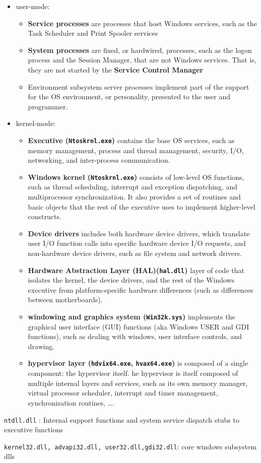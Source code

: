 \begin{itemize}
    \item user-mode:
        \begin{itemize}
            \item {\bf Service processes} are processes that host Windows services, such as the Task Scheduler and Print Spooler services
            \item {\bf System processes} are fixed, or hardwired, processes, such as the logon process and the Session Manager, that are not Windows services. That is, they are not started by the {\bf Service Control Manager}
            \item Environment subsystem server processes implement part of the support for the OS environment, or personality, presented to the user and programmer. 
        \end{itemize}
    \item kernel-mode:
        \begin{itemize}
            \item {\bf Executive (\verb+Ntoskrnl.exe+)} contains the base OS services, such as memory management, process and thread management, security, I/O, networking, and inter-process communication.
            \item {\bf Windows kernel (\verb+Ntoskrnl.exe+)} consists of low-level OS functions, such as thread scheduling, interrupt and exception dispatching, and multiprocessor synchronization. It also provides a set of routines and basic objects that the rest of the executive uses to implement higher-level constructs.
            \item {\bf Device drivers} includes both hardware device drivers, which translate user I/O function calls into specific hardware device I/O requests, and non-hardware device drivers, such as file system and network drivers.
            \item {\bf Hardware Abstraction Layer (HAL)(\verb+hal.dll+)}  layer of code that isolates the kernel, the  device drivers, and the rest of the Windows executive from platform-specific hardware differences (such as differences between motherboards).
            \item {\bf windowing and graphics system (\verb+Win32k.sys+)} implements the graphical user interface (GUI) functions (aka Windows USER and GDI functions), such as dealing with windows, user interface controls, and drawing.
            \item {\bf hypervisor layer (\verb+hdvix64.exe+, \verb+hvax64.exe+)} is composed of a single component: the hypervisor itself. he hypervisor is itself composed of multiple internal layers and services, such as its own memory manager, virtual processor scheduler, interrupt and timer management, synchronization routines, \ldots.
        \end{itemize}
\end{itemize}


\verb+ntdll.dll+ : Internal support functions and system service dispatch stubs to executive functions

\verb+kernel32.dll, advapi32.dll, user32.dll,gdi32.dll+: core windows subsystem dlls